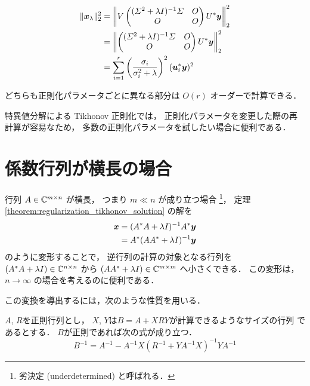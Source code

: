 \begin{align}
    \|\bm{x}_{\lambda}\|_2^2
     & = \left\| V
    \begin{pmatrix}
        (\varSigma^2 + \lambda I)^{-1} \varSigma & O \\
        O                                  & O
    \end{pmatrix}
    U^* \bm{y} \right\|_2^2
    \notag                                                                                          \\
     & = \left\|
    \begin{pmatrix}
        (\varSigma^2 + \lambda I)^{-1} \varSigma & O \\
        O                                  & O
    \end{pmatrix}
    U^* \bm{y} \right\|_2^2
    \notag                                                                                          \\
     & = \sum_{i = 1}^r \left(\frac{\sigma_i}{\sigma_i^2 + \lambda}\right)^2  (\bm{u}_i^* \bm{y})^2
    \label{eq:regularization_tikhonov_regularization-term-by-svd}
\end{align}

どちらも正則化パラメータごとに異なる部分は $O(r)$ オーダーで計算できる．

特異値分解による Tikhonov 正則化では，
正則化パラメータを変更した際の再計算が容易なため，
多数の正則化パラメータを試したい場合に便利である．

\section{係数行列が横長の場合}\label{sec:regularization_tikhonov_underdetermined}

行列 $A \in \mathbb{C}^{m \times n}$ が横長，
つまり $m \ll n$ が成り立つ場合
\footnote{劣決定 (underdetermined) と呼ばれる．}，
定理 \ref{theorem:regularization_tikhonov_solution} の解を
\begin{align}
    \bm{x} & = (A^* A + \lambda I)^{-1} A^* \bm{y} \notag \\
           & = A^* (AA^* + \lambda I)^{-1} \bm{y}
    \label{eq:regularization_tikhonov_exchange-mat}
\end{align}
のように変形することで，
逆行列の計算の対象となる行列を
$(A^* A + \lambda I) \in \mathbb{C}^{n \times n}$ から
$(A A^* + \lambda I) \in \mathbb{C}^{m \times m}$ へ小さくできる．
この変形は，$n \to \infty$ の場合を考えるのに便利である．

この変換を導出するには，次のような性質を用いる．
\begin{lemma}
    $A$, $R$を正則行列とし，
    $X$, $Y$は$B=A+XRY$が計算できるようなサイズの行列
    であるとする．
    $B$が正則であれば次の式が成り立つ．
    \begin{equation}
        B^{-1}=
        A^{-1}-A^{-1}X(R^{-1}+YA^{-1}X)^{-1}YA^{-1}
    \end{equation}
\end{lemma}

